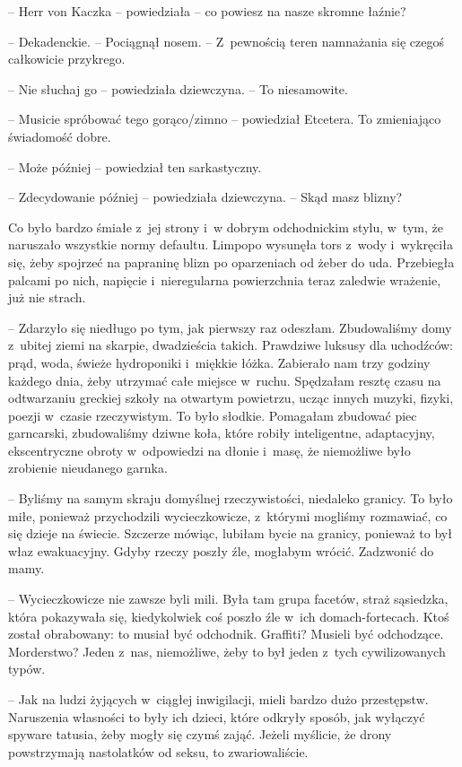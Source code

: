 \documentclass[oneside,polish,11pt,sfheadings]{mwbk}
\begin{document}
-- Herr von Kaczka -- powiedziała -- co powiesz na nasze skromne łaźnie?

-- Dekadenckie. -- Pociągnął nosem. -- Z~pewnością teren namnażania się
czegoś całkowicie przykrego.

-- Nie słuchaj go -- powiedziała dziewczyna. -- To niesamowite.

-- Musicie spróbować tego gorąco/zimno -- powiedział Etcetera. To
zmieniająco świadomość dobre.

-- Może później -- powiedział ten sarkastyczny.

-- Zdecydowanie później -- powiedziała dziewczyna. -- Skąd masz blizny?

Co było bardzo śmiałe z~jej strony i~w dobrym odchodnickim stylu, w~tym,
że naruszało wszystkie normy defaultu. Limpopo wysunęła tors z~wody i~wykręciła się, żeby spojrzeć na papraninę blizn po oparzeniach od żeber
do uda. Przebiegła palcami po nich, napięcie i~nieregularna powierzchnia
teraz zaledwie wrażenie, już nie strach.

-- Zdarzyło się niedługo po tym, jak pierwszy raz odeszłam. Zbudowaliśmy
domy z~ubitej ziemi na skarpie, dwadzieścia takich. Prawdziwe luksusy
dla uchodźców: prąd, woda, świeże hydroponiki i~miękkie łóżka. Zabierało
nam trzy godziny każdego dnia, żeby utrzymać całe miejsce w~ruchu.
Spędzałam resztę czasu na odtwarzaniu greckiej szkoły na otwartym
powietrzu, ucząc innych muzyki, fizyki, poezji w~czasie rzeczywistym. To
było słodkie. Pomagałam zbudować piec garncarski, zbudowaliśmy dziwne
koła, które robiły inteligentne, adaptacyjny, ekscentryczne obroty w~odpowiedzi na dłonie i~masę, że niemożliwe było zrobienie nieudanego
garnka.

-- Byliśmy na samym skraju domyślnej rzeczywistości, niedaleko granicy.
To było miłe, ponieważ przychodzili wycieczkowicze, z~którymi mogliśmy
rozmawiać, co się dzieje na świecie. Szczerze mówiąc, lubiłam bycie na
granicy, ponieważ to był właz ewakuacyjny. Gdyby rzeczy poszły źle,
mogłabym wrócić. Zadzwonić do mamy.

-- Wycieczkowicze nie zawsze byli mili. Była tam grupa facetów, straż
sąsiedzka, która pokazywała się, kiedykolwiek coś poszło źle w~ich
domach-fortecach. Ktoś został obrabowany: to musiał być odchodnik.
Graffiti? Musieli być odchodzące. Morderstwo? Jeden z~nas, niemożliwe,
żeby to był jeden z~tych cywilizowanych typów.

-- Jak na ludzi żyjących w~ciągłej inwigilacji, mieli bardzo dużo
przestępstw. Naruszenia własności to były ich dzieci, które odkryły
sposób, jak wyłączyć spyware tatusia, żeby mogły się czymś zająć. Jeżeli
myślicie, że drony powstrzymają nastolatków od seksu, to zwariowaliście.
\end{document}
